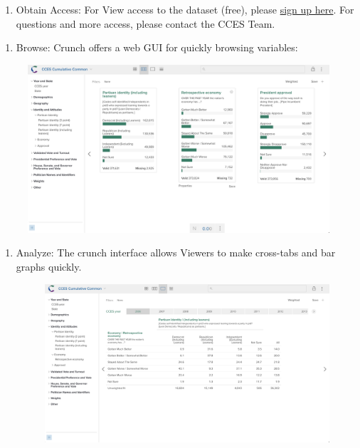 \documentclass[10pt,article,oneside]{memoir}
\theoremstyle{definition}
\begin{document}
\begin{enumerate}
\def\labelenumi{\arabic{enumi}.}
\tightlist
\item
  Obtain Access: For View access to the dataset (free), please
  \href{https://harvard.az1.qualtrics.com/jfe/form/SV_066hQi4Eeco3Kap}{sign
  up here}. For questions and more access, please contact the CCES Team.
\end{enumerate}

\newpage

\begin{enumerate}
\def\labelenumi{\arabic{enumi}.}
\setcounter{enumi}{1}
\tightlist
\item
  Browse: Crunch offers a web GUI for quickly browsing variables:
\end{enumerate}

\begin{figure}[H]
\centering
\centerline{\includegraphics[width=1.05\linewidth]{01_crunch_browse.png}}
\end{figure}

\begin{enumerate}
\def\labelenumi{\arabic{enumi}.}
\setcounter{enumi}{2}
\tightlist
\item
  Analyze: The crunch interface allows Viewers to make cross-tabs and
  bar graphs quickly.\\

  \begin{figure}[H]
  \centering
  \centerline{\includegraphics[width=1.05\linewidth]{02_crunch_tab.png}}
  \end{figure}
\end{enumerate}
\end{document}
